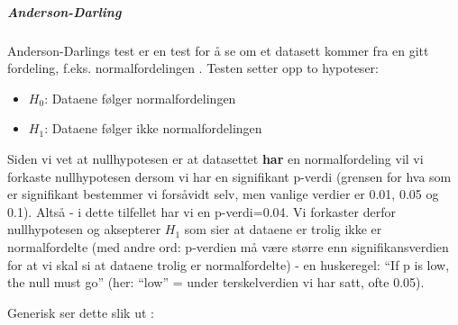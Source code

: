 \documentclass[
]{article}
\newenvironment{Shaded}{\begin{snugshade}}{\end{snugshade}}
\newcommand{\CommentTok}[1]{\textcolor[rgb]{0.56,0.35,0.01}{\textit{#1}}}
\newcommand{\FunctionTok}[1]{\textcolor[rgb]{0.00,0.00,0.00}{#1}}
\newcommand{\NormalTok}[1]{#1}
\newcommand{\OtherTok}[1]{\textcolor[rgb]{0.56,0.35,0.01}{#1}}
\newcommand{\SpecialCharTok}[1]{\textcolor[rgb]{0.00,0.00,0.00}{#1}}
\newcommand{\StringTok}[1]{\textcolor[rgb]{0.31,0.60,0.02}{#1}}
\providecommand{\tightlist}{%
  \setlength{\itemsep}{0pt}\setlength{\parskip}{0pt}}
\begin{document}
\hypertarget{anderson-darling}{%
\subparagraph{Anderson-Darling}\label{anderson-darling}}

Anderson-Darlings test er en test for å se om et datasett kommer fra en gitt fordeling, f.eks. normalfordelingen \citep{andersonAsymptoticTheoryCertain1952b, andersonTestGoodnessFit1954}. Testen setter opp to hypoteser:

\begin{itemize}
\tightlist
\item
  \(H_0\): Dataene følger normalfordelingen
\item
  \(H_1\): Dataene følger ikke normalfordelingen
\end{itemize}

\begin{Shaded}
\end{Shaded}

Siden vi vet at nullhypotesen er at datasettet \textbf{har} en normalfordeling vil vi forkaste nullhypotesen dersom vi har en signifikant p-verdi (grensen for hva som er signifikant bestemmer vi forsåvidt selv, men vanlige verdier er 0.01, 0.05 og 0.1). Altså - i dette tilfellet har vi en p-verdi=0.04. Vi forkaster derfor nullhypotesen og aksepterer \(H_1\) som sier at dataene er trolig ikke er normalfordelte (med andre ord: p-verdien må være større enn signifikansverdien for at vi skal si at dataene trolig er normalfordelte) - en huskeregel: ``If p is low, the null must go'' (her: ``low'' = under terskelverdien vi har satt, ofte 0.05).

Generisk ser dette slik ut \citep{hartmannELearningProjectSOGA2018}:
\end{document}
